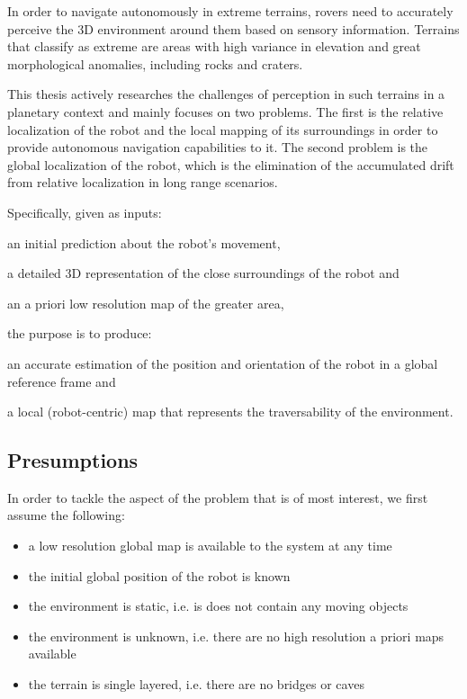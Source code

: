In order to navigate autonomously in extreme terrains, rovers need to
accurately perceive the 3D environment around them based on sensory
information.
Terrains that classify as extreme are areas with high variance in elevation
and great morphological anomalies, including rocks and craters.

This thesis actively researches the challenges of perception in such terrains
in a planetary context and mainly focuses on two problems.
The first is the relative localization of the robot and the local mapping
of its surroundings in order to provide autonomous navigation capabilities
to it.
The second problem is the global localization of the robot, which is the
elimination of the accumulated drift from relative localization in long
range scenarios.

Specifically, given as inputs:
\begin{enumerate*}[label=(\roman*)]
    \item an initial prediction about the robot's movement,
    \item a detailed 3D representation of the close surroundings of the robot
        and
    \item an a priori low resolution map of the greater area,
\end{enumerate*}
the purpose is to produce:
\begin{enumerate*}[label=(\roman*)]
    \item an accurate estimation of the position and orientation of the
        robot in a global reference frame and
    \item a local (robot-centric) map that represents the traversability of
        the environment.
\end{enumerate*}

\subsection{Presumptions}

In order to tackle the aspect of the problem that is of most interest,
we first assume the following:

\begin{itemize}
    \item a low resolution global map is available to the system at any time
    \item the initial global position of the robot is known
    \item the environment is static, i.e. is does not contain any
        moving objects
    \item the environment is unknown, i.e. there are no high resolution
        a priori maps available
    \item the terrain is single layered, i.e. there are no bridges or caves
\end{itemize}

